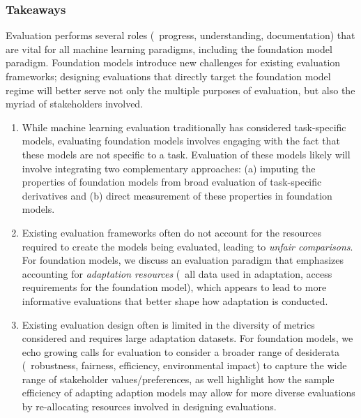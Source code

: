 \subsubsection{Takeaways}
\label{sec:evaluation-takeaways}
Evaluation performs several roles (\ie~progress, understanding, documentation) that are vital for all machine learning paradigms, including the foundation model paradigm.
Foundation models introduce new challenges for existing evaluation frameworks; designing evaluations that directly target the foundation model regime will better serve not only the multiple purposes of evaluation, but also the myriad of stakeholders involved.
\begin{enumerate}
    \item 
    While machine learning evaluation traditionally has considered task-specific models, evaluating foundation models involves engaging with the fact that these models are not specific to a task. 
    Evaluation of these models likely will involve integrating two complementary approaches: (a) imputing the properties of foundation models from broad evaluation of task-specific derivatives and (b) direct measurement of these properties in foundation models.  
    \item
    Existing evaluation frameworks often do not account for the resources required to create the models being evaluated, leading to \textit{unfair comparisons}.
    For foundation models, we discuss an evaluation paradigm that emphasizes accounting for \textit{adaptation resources} (\eg~all data used in adaptation, access requirements for the foundation model), which appears to lead to more informative evaluations that better shape how adaptation is conducted.
    \item 
    Existing evaluation design often is limited in the diversity of metrics considered and requires large adaptation datasets.
    For foundation models, we echo growing calls for evaluation to consider a broader range of desiderata (\eg~robustness, fairness, efficiency, environmental impact) to capture the wide range of stakeholder values/preferences, as well highlight how the sample efficiency of adapting adaption models may allow for more diverse evaluations by re-allocating resources involved in designing evaluations.
\end{enumerate}
